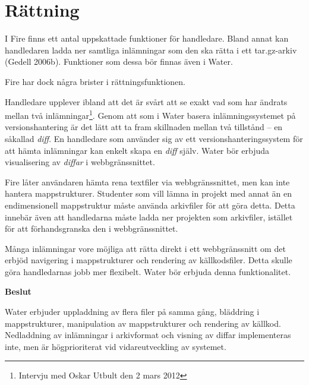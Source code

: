 \section{Rättning}

I Fire finns ett antal uppskattade funktioner för handledare. Bland annat kan handledaren ladda ner samtliga inlämningar som den ska rätta i ett tar.gz-arkiv (Gedell 2006b). Funktioner som dessa bör finnas även i Water.

Fire har dock några brister i rättningsfunktionen.

Handledare upplever ibland att det är svårt att se exakt vad som har ändrats mellan två inlämningar\footnote{Intervju med Oskar Utbult den 2 mars 2012}. Genom att som i Water basera inlämningssystemet på versionshantering är det lätt att ta fram skillnaden mellan två tillstånd – en såkallad \emph{diff}. En handledare som använder sig av ett versionshanteringssystem för att hämta inlämningar kan enkelt skapa en \emph{diff} själv. Water bör erbjuda visualisering av \emph{diffar} i webbgränssnittet.

Fire låter användaren hämta rena textfiler via webbgränssnittet, men kan inte hantera mappstrukturer. Studenter som vill lämna in projekt med annat än en endimensionell mappstruktur måste använda arkivfiler för att göra detta. Detta innebär även att handledarna måste ladda ner projekten som arkivfiler, istället för att förhandsgranska den i webbgränssnittet.

Många inlämningar vore möjliga att rätta direkt i ett webbgränssnitt om det erbjöd navigering i mappstrukturer och rendering av källkodsfiler. Detta skulle göra handledarnas jobb mer flexibelt. Water bör erbjuda denna funktionalitet.

\begin{flushright}
  
  \textbf{Beslut}
  
  Water erbjuder uppladdning av flera filer på samma gång, bläddring i mappstrukturer, manipulation av mappstrukturer och rendering av källkod. Nedladdning av inlämningar i arkivformat och visning av diffar implementeras inte, men är högprioriterat vid vidareutveckling av systemet.
  
\end{flushright}